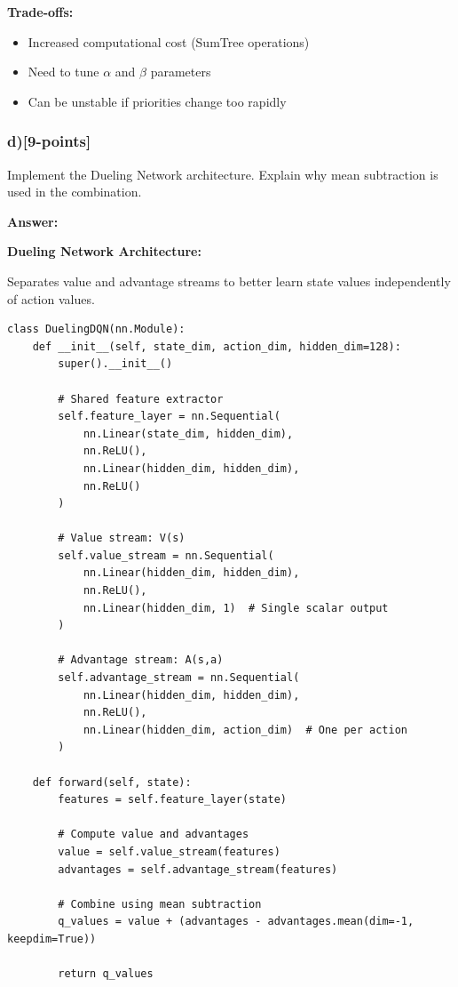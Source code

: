 \documentclass[12pt]{article}
\begin{document}
{{\textbf{Trade-offs:}
\begin{itemize}
\item Increased computational cost (SumTree operations)
\item Need to tune $\alpha$ and $\beta$ parameters
\item Can be unstable if priorities change too rapidly
\end{itemize}

\subsubsection{d)[9-points]} Implement the Dueling Network architecture. Explain why mean subtraction is used in the combination.

\textbf{Answer:}

\textbf{Dueling Network Architecture:}

Separates value and advantage streams to better learn state values independently of action values.

\begin{verbatim}
class DuelingDQN(nn.Module):
    def __init__(self, state_dim, action_dim, hidden_dim=128):
        super().__init__()

        # Shared feature extractor
        self.feature_layer = nn.Sequential(
            nn.Linear(state_dim, hidden_dim),
            nn.ReLU(),
            nn.Linear(hidden_dim, hidden_dim),
            nn.ReLU()
        )

        # Value stream: V(s)
        self.value_stream = nn.Sequential(
            nn.Linear(hidden_dim, hidden_dim),
            nn.ReLU(),
            nn.Linear(hidden_dim, 1)  # Single scalar output
        )

        # Advantage stream: A(s,a)
        self.advantage_stream = nn.Sequential(
            nn.Linear(hidden_dim, hidden_dim),
            nn.ReLU(),
            nn.Linear(hidden_dim, action_dim)  # One per action
        )

    def forward(self, state):
        features = self.feature_layer(state)

        # Compute value and advantages
        value = self.value_stream(features)
        advantages = self.advantage_stream(features)

        # Combine using mean subtraction
        q_values = value + (advantages - advantages.mean(dim=-1, keepdim=True))

        return q_values
\end{verbatim}

}}
\end{document}
